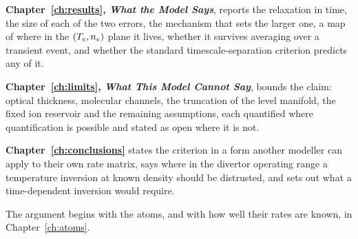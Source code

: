 \textbf{Chapter~\ref{ch:results}, \emph{What the Model Says}}, reports the
relaxation in time, the size of each of the two errors, the mechanism that sets
the larger one, a map of where in the $(T_e,n_e)$ plane it lives, whether it
survives averaging over a transient event, and whether the standard
timescale-separation criterion predicts any of it.

\textbf{Chapter~\ref{ch:limits}, \emph{What This Model Cannot Say}}, bounds the
claim: optical thickness, molecular channels, the truncation of the level
manifold, the fixed ion reservoir and the remaining assumptions, each quantified
where quantification is possible and stated as open where it is not.

\textbf{Chapter~\ref{ch:conclusions}} states the criterion in a form another
modeller can apply to their own rate matrix, says where in the divertor operating
range a temperature inversion at known density should be distrusted, and sets out what a
time-dependent inversion would require.

The argument begins with the atoms, and with how well their rates are known, in
Chapter~\ref{ch:atoms}.
